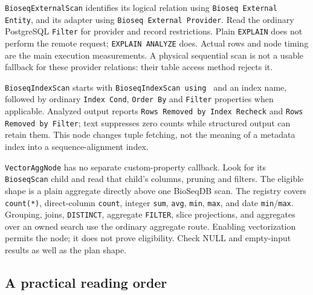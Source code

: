 \texttt{BioseqExternalScan} identifies its logical relation using
\texttt{Bioseq External Entity}, and its adapter using
\texttt{Bioseq External Provider}. Read the ordinary PostgreSQL
\texttt{Filter} for provider and record restrictions. Plain
\texttt{EXPLAIN} does not perform the remote request;
\texttt{EXPLAIN ANALYZE} does. Actual rows and node timing are the main
execution measurements. A physical sequential scan is not a usable fallback
for these provider relations: their table access method rejects it.

\texttt{BioseqIndexScan} starts with \texttt{BioseqIndexScan using } and an
index name, followed by ordinary \texttt{Index Cond}, \texttt{Order By} and
\texttt{Filter} properties when applicable. Analyzed output reports
\texttt{Rows Removed by Index Recheck} and \texttt{Rows Removed by Filter};
text suppresses zero counts while structured output can retain them.
This node changes tuple fetching, not the meaning of a metadata index into a
sequence-alignment index.

\texttt{VectorAggNode} has no separate custom-property callback. Look for its
\texttt{BioseqScan} child and read that child's columns, pruning and filters.
The eligible shape is a plain aggregate directly above one BioSeqDB scan.
The registry covers \texttt{count(*)}, direct-column \texttt{count}, integer
\texttt{sum}, \texttt{avg}, \texttt{min}, \texttt{max}, and date
\texttt{min}/\texttt{max}. Grouping, joins, \texttt{DISTINCT}, aggregate
\texttt{FILTER}, slice projections, and aggregates over an owned search use
the ordinary aggregate route. Enabling vectorization permits the node;
it does not prove eligibility. Check NULL and empty-input results as well as
the plan shape.

\subsection{A practical reading order}

